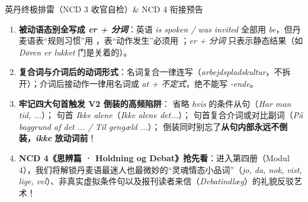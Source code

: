 \begin{grammatikbox}{英丹终极排雷（NCD 3 收官自检）\& NCD 4 衔接预告}
\begin{enumerate}
  \item \textbf{被动语态别全写成 \textit{er + 分词}}：英语 \textit{is spoken / was invited} 全部用 \textit{be}，但丹麦语表“规则习惯”用 ，表“动作发生”必须用 ；\textit{er + 分词} 只表示静态结果（如 \textit{Døren er lukket} 门是关着的）。
  \item \textbf{复合词与介词后的动词形式}：名词复合一律连写（\textit{arbejdspladskultur}，不拆开）；介词后接动作一律用名词或 \textit{at + 不定式}，绝不能写 \textit{-ende}。
  \item \textbf{牢记四大句首触发 V2 倒装的高频陷阱}： 省略 \textit{hvis} 的条件从句（\textit{Har man tid, ...}）； 句首 \textit{Ikke alene}（\textit{Ikke alene  det...}）； 句首复合介词或对比副词（\textit{På baggrund af det ... / Til gengæld ...}）； 倒装同时别忘了\textbf{从句内部永远不倒装，\textit{ikke} 放动词前}！
  \item \textbf{NCD 4《思辨篇 · Holdning og Debat》抢先看}：进入第四册（Modul 4），我们将解锁丹麦语最迷人也最微妙的“灵魂情态小品词”（\textit{jo, da, nok, vist, lige, vel}）、非真实虚拟条件句以及报刊读者来信（\textit{Debatindlæg}）的礼貌反驳艺术！
\end{enumerate}
\end{grammatikbox}


